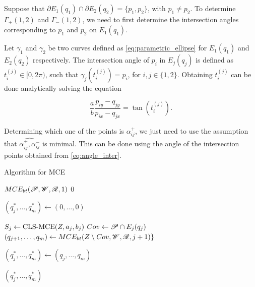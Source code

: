 Suppose that $\partial E_1(q_1) \cap \partial E_2(q_2) = \{p_1, p_2\}$, with $p_1 \neq p_2$. To determine $\Gamma_+(1,2)$ and $\Gamma_-(1,2)$, we need to first determine the intersection angles corresponding to $p_1$ and $p_2$ on $E_1(q_1)$. 

Let $\gamma_1$ and $\gamma_2$ be two curves defined as \autoref{eq:parametric_ellipse} for $E_1(q_1)$ and $E_2(q_2)$ respectively. 
The intersection angle of $p_i$ in $E_j(q_j)$ is defined as $t_i^{(j)} \in [0, 2\pi)$, such that $\gamma_j(t_i^{(j)}) = p_i$, for $i, j \in \{1, 2\}$. Obtaining $t_i^{(j)}$ can be done analytically solving the equation

\begin{equation}\label{eq:angle_inter}
	\dfrac{a}{b}\dfrac{p_{iy}-q_{jy}}{p_{ix}-q_{jx}} = \tan{(t_i^{(j)})}.
\end{equation}

Determining which one of the points is $\alpha_{ij}^+$, we just need to use the assumption that $\widehat{\alpha_{ij}^+, \alpha_{ij}^-}$ is minimal. This can be done using the angle of the intersection points obtained from \autoref{eq:angle_inter}. 

\begin{algoritmo}
	\caption{Algorithm for MCE}\label{algoritmo:mce2}
	
	\begin{algorithmic}[1]
		
		
		\item[]
		\State \Return $MCE_{bt}(\mathscr{P}, \mathscr{W}, \mathscr{R}, 1)$
		\EndProcedure
		\State
		\State \Return $0$
		\EndIf
		
		\State $(q_j^*, \dots, q_m^*) \gets (0, \dots, 0)$
		
		\State $S_j \gets \textnormal{CLS-MCE}(Z, a_j, b_j)$
		\State $Cov \gets \mathscr{P} \cap E_j(q_j)$
		\State $(q_{j+1}, \dots, q_m) \gets MCE_{bt}(Z \setminus Cov, \mathscr{W}, \mathscr{R}, j+1)\}$
		
		\State $(q_j^*, \dots, q_m^*) \gets(q_j, \dots, q_m)$
		\EndIf
		\EndFor
		
		\State \Return $(q_j^*, \dots, q_m^*)$
		\EndProcedure
	\end{algorithmic}
\end{algoritmo}